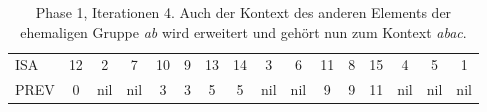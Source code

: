 \begin{table}[H]
\begin{adjustbox}{max width=\textwidth}
\begin{tabular}{lccccccccccccccc}
\multicolumn{1}{l|}{ISA}     & 12                      & 2   & 7   & 10 & 9                       & 13                                                & 14                         & 3                         & 6                        & 11 & 8                         & 15  & 4   & 5   & 1   \\
\multicolumn{1}{l|}{PREV}    & 0                       & nil & nil & 3  & 3                       & 5                                                 & 5                          & nil                       & nil                      & 9  & \cellcolor[HTML]{\red}9 & 11  & nil & nil & nil
\end{tabular}
\end{adjustbox}

\caption[Phase 1, Iterationen 4]{Phase 1, Iterationen 4. Auch der Kontext des anderen Elements der ehemaligen Gruppe \textit{ab} wird erweitert und gehört nun zum Kontext \textit{abac}.}
\label{table_complex_example_1_4} 
\end{table}

